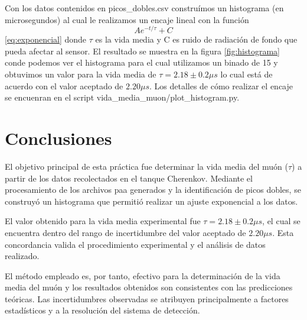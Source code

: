 \documentclass[twocolumn,a4paper,11pt]{scrartcl}
\begin{document}
Con los datos contenidos en picos\_dobles.csv construímos un histograma (en microsegundos) al cual le realizamos un encaje lineal con la función $$Ae^{-t/\tau} + C$$ \ref{eq:exponencial} donde $\tau$ es la vida media y C es ruido de radiación de fondo que pueda afectar al sensor. El resultado se muestra en la figura \ref{fig:histograma} conde podemos ver el histograma para el cual utilizamos un binado de 15 y obtuvimos un valor para la vida media de $\tau =  2.18 \pm 0.2 \mu s$ lo cual está de acuerdo con el valor aceptado de $2.20 \mu s$. Los detalles de cómo realizar el encaje se encuenran en el script vida\_media\_muon/plot\_histogram.py.

\section{Conclusiones}

El objetivo principal de esta práctica fue determinar la vida media del muón ($\tau$) a partir de los datos recolectados en el tanque Cherenkov. Mediante el procesamiento de los archivos paa generados y la identificación de picos dobles, se construyó un histograma que permitió realizar un ajuste exponencial a los datos.

El valor obtenido para la vida media experimental fue $\tau = 2.18 \pm 0.2 \mu s$, el cual se encuentra dentro del rango de incertidumbre del valor aceptado de $2.20 \mu s$.  Esta concordancia valida el procedimiento experimental y el análisis de datos realizado.

El método empleado es, por tanto, efectivo para la determinación de la vida media del muón y los resultados obtenidos son consistentes con las predicciones teóricas.  Las incertidumbres observadas se atribuyen principalmente a factores estadísticos y a la resolución del sistema de detección.


 
\end{document}
